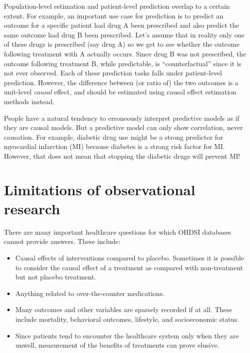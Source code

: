 \documentclass[11pt]{book}
\providecommand{\tightlist}{%
  \setlength{\itemsep}{0pt}\setlength{\parskip}{0pt}}
\theoremstyle{definition}
\theoremstyle{definition}
\theoremstyle{definition}
\theoremstyle{remark}
\let\BeginKnitrBlock\begin \let\EndKnitrBlock\end
\begin{document}
Population-level estimation and patient-level prediction overlap to a certain extent. For example, an important use case for prediction is to predict an outcome for a specific patient had drug A been prescribed and also predict the same outcome had drug B been prescribed. Let's assume that in reality only one of these drugs is prescribed (say drug A) so we get to see whether the outcome following treatment with A actually occurs. Since drug B was not prescribed, the outcome following treatment B, while predictable, is ``counterfactual'' since it is not ever observed. Each of these prediction tasks falls under patient-level prediction. However, the difference between (or ratio of) the two outcomes is a unit-level \emph{causal} effect, and should be estimated using causal effect estimation methods instead.

\BeginKnitrBlock{rmdimportant}
People have a natural tendency to erroneously interpret predictive models as if they are causal models. But a predictive model can only show correlation, never causation. For example, diabetic drug use might be a strong predictor for myocardial infarction (MI) because diabetes is a strong risk factor for MI. However, that does not mean that stopping the diabetic drugs will prevent MI!
\EndKnitrBlock{rmdimportant}

\hypertarget{limitations-of-observational-research}{%
\section{Limitations of observational research}\label{limitations-of-observational-research}}

There are many important healthcare questions for which OHDSI databases cannot provide answers. These include:

\begin{itemize}
\tightlist
\item
  Causal effects of interventions compared to placebo. Sometimes it is possible to consider the causal effect of a treatment as compared with non-treatment but not placebo treatment.
\item
  Anything related to over-the-counter medications.
\item
  Many outcomes and other variables are sparsely recorded if at all. These include mortality, behavioral outcomes, lifestyle, and socioeconomic status.
\item
  Since patients tend to encounter the healthcare system only when they are unwell, measurement of the benefits of treatments can prove elusive.
\end{itemize}
\end{document}
